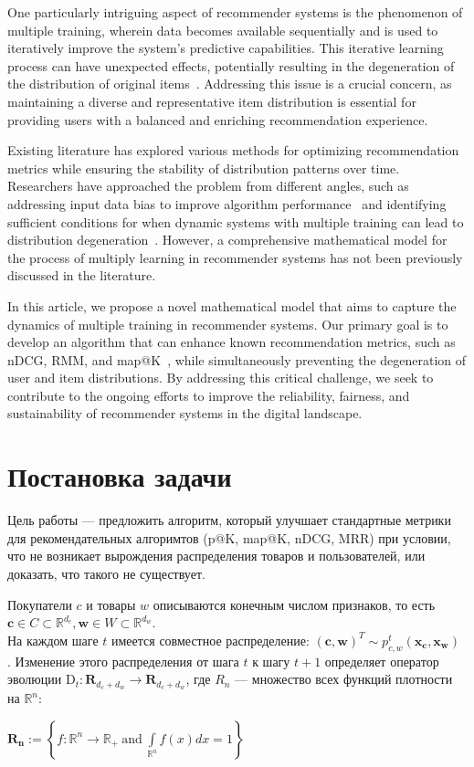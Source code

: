 \documentclass{article}
\begin{document}
One particularly intriguing aspect of recommender systems is the phenomenon of multiple training, wherein data becomes available sequentially and is used to iteratively improve the system's predictive capabilities. This iterative learning process can have unexpected effects, potentially resulting in the degeneration of the distribution of original items~\cite{KhritankovFeedbackLoops}. Addressing this issue is a crucial concern, as maintaining a diverse and representative item distribution is essential for providing users with a balanced and enriching recommendation experience.

Existing literature has explored various methods for optimizing recommendation metrics while ensuring the stability of distribution patterns over time. Researchers have approached the problem from different angles, such as addressing input data bias to improve algorithm performance~\cite{krueger2020hidden} and identifying sufficient conditions for when dynamic systems with multiple training can lead to distribution degeneration~\cite{inproceedings}. However, a comprehensive mathematical model for the process of multiply learning in recommender systems has not been previously discussed in the literature.

In this article, we propose a novel mathematical model that aims to capture the dynamics of multiple training in recommender systems. Our primary goal is to develop an algorithm that can enhance known recommendation metrics, such as nDCG, RMM, and map@K~\cite{TowardsConversational, wang2013theoretical}, while simultaneously preventing the degeneration of user and item distributions. By addressing this critical challenge, we seek to contribute to the ongoing efforts to improve the reliability, fairness, and sustainability of recommender systems in the digital landscape.

\section{Постановка задачи}

Цель работы --- предложить алгоритм, который улучшает стандартные метрики для рекомендательных алгоримтов (p@K, map@K, nDCG, MRR) при условии, что не возникает вырождения распределения товаров и пользователей, или доказать, что такого не существует. 

Покупатели $c$ и товары $w$ описываются конечным числом признаков, то есть $ \mathbf{c} \in C \subset \mathbb{R}^{d_c}, \mathbf{w} \in W \subset \mathbb{R}^{d_w}$.\\
На каждом шаге $t$ имеется совместное распределение: $(\mathbf{c}, \mathbf{w})^T \sim p^{t}_{c,w} (\mathbf{x_c} , \mathbf{x_w} )$ . Изменение этого распределения от шага $t$ к шагу $t + 1$ определяет оператор эволюции $\text{D}_t : \textbf{R}_{d_c + d_w} \rightarrow \textbf{R}_{d_c + d_w} $, где $R_n$ --- множество всех функций плотности на $\mathbb{R}^n:$
\begin{center}
$
        \mathbf{R_n} := \left\{f : \mathbb{R}^n \rightarrow \mathbb{R}_+ ~\text{and}~ \int\limits_{\mathbb{R}^n}f(x)dx = 1\right\}
        $
\end{center}
\end{document}
